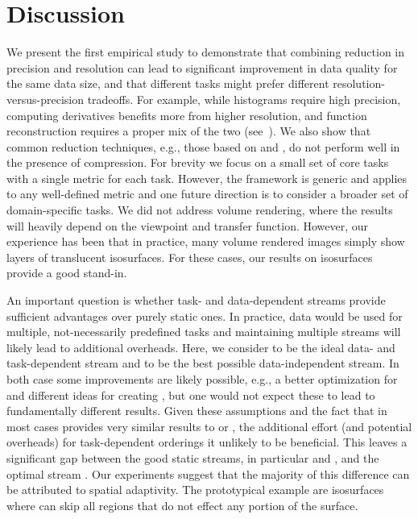 \section{Discussion}

We present the first empirical study to demonstrate that combining reduction in precision and
resolution can lead to significant improvement in data quality for the same data size, and that
different tasks might prefer different resolution-versus-precision tradeoffs. For example, while
histograms require high precision, computing derivatives benefits more from higher resolution, and
function reconstruction requires a proper mix of the two (see~). We also show
that common reduction techniques, e.g., those based on \slvl and \smag, do not perform well in the
presence of compression. For brevity we focus on a small set of core tasks with a single metric for
each task. However, the framework is generic and applies to any well-defined metric and one future
direction is to consider a broader set of domain-specific tasks. We did not address volume
rendering, where the results will heavily depend on the viewpoint and transfer function. However,
our experience has been that in practice, many volume rendered images simply show layers of
translucent isosurfaces. For these cases, our results on isosurfaces provide a good stand-in.

An important question is whether task- and data-dependent streams provide sufficient advantages over
purely static ones. In practice, data would be used for multiple, not-necessarily predefined tasks
and maintaining multiple streams will likely lead to additional overheads. Here, we consider \sopt
to be the ideal data- and task-dependent stream and \ssig to be the best possible data-independent
stream. In both case some improvements are likely possible, e.g., a better optimization for \sopt
and different ideas for creating \ssig, but one would not expect these to lead to fundamentally
different results. Given these assumptions and the fact that \ssig in most cases provides very
similar results to \sbit or \swav, the additional effort (and potential overheads) for
task-dependent orderings it unlikely to be beneficial. This leaves a significant gap between the
good static streams, in particular \swav and \sbit, and the optimal stream \sopt. Our experiments
suggest that the majority of this difference can be attributed to spatial adaptivity. The
prototypical example are isosurfaces where \sopt can skip all regions that do not effect any
portion of the surface.

